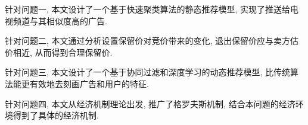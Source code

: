 针对问题一, 本文设计了一个基于快速聚类算法的静态推荐模型,
实现了推送给电视频道与其相似度高的广告.

针对问题二, 本文通过分析设置保留价对竞价带来的变化, 退出保留价应与卖方估价相近,
从而得到合理保留价.

针对问题三, 本文设计了一个基于协同过滤和深度学习的动态推荐模型,
比传统算法能更有效地去刻画广告和用户的特征.

针对问题四, 本文从经济机制理论出发, 推广了格罗夫斯机制,
结合本问题的经济环境得到了具体的经济机制.
